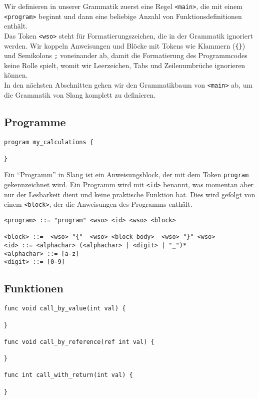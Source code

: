 Wir definieren in unserer Grammatik zuerst eine Regel \texttt{<main>}, die mit einem \texttt{<program>} beginnt und dann eine beliebige Anzahl von Funktionsdefinitionen enthält.\\
Das Token \texttt{<wso>} steht für Formatierungszeichen, die in der Grammatik ignoriert werden.
Wir koppeln Anweisungen und Blöcke mit Tokens wie Klammern (\texttt{\{\}}) und Semikolons \texttt{;} voneinander ab, damit die Formatierung des Programmcodes keine Rolle spielt, womit wir Leerzeichen, Tabs und Zeilenumbrüche ignorieren können.\\
In den nächsten Abschnitten gehen wir den Grammatikbaum von \texttt{<main>} ab, um die Grammatik von Slang komplett zu definieren.\\

\subsection{Programme}

\begin{lstlisting}
program my_calculations {

}
\end{lstlisting}

Ein ``Programm'' in Slang ist ein Anweisungsblock, der mit dem Token \texttt{program} gekennzeichnet wird.
Ein Programm wird mit \texttt{<id>} benannt, was momentan aber nur der Lesbarkeit dient und keine praktische Funktion hat.
Dies wird gefolgt von einem \texttt{<block>}, der die Anweisungen des Programms enthält.\\

\begin{lstlisting}
<program> ::= "program" <wso> <id> <wso> <block>

<block> ::=  <wso> "{"  <wso> <block_body>  <wso> "}" <wso>
<id> ::= <alphachar> (<alphachar> | <digit> | "_")*
<alphachar> ::= [a-z]
<digit> ::= [0-9]
\end{lstlisting}

\subsection{Funktionen}

\begin{lstlisting}
func void call_by_value(int val) {

}

func void call_by_reference(ref int val) {

}

func int call_with_return(int val) {

}
\end{lstlisting}

